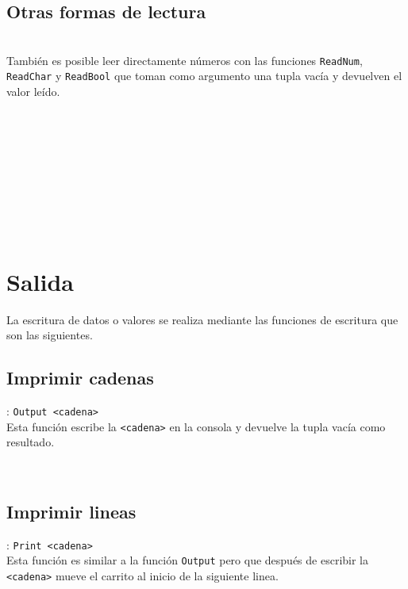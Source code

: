       \subsection*{Otras formas de lectura}\texttt{}\\
      También es posible leer directamente números con las funciones \texttt{ReadNum}, \texttt{ReadChar} y \texttt{ReadBool} que toman como argumento una tupla vacía y devuelven el valor leído.
      
      \begin{fxcode}
         \\
         \\
         \\
         \\
         \\
         \\
         \\
         \\
      \end{fxcode}
      
   \section{Salida}
      La escritura de datos o valores se realiza mediante las funciones de escritura que son las siguientes.
      
      \subsection*{Imprimir cadenas}: \texttt{Output <cadena>}\\
      Esta función escribe la \texttt{<cadena>} en la consola y devuelve la tupla vacía como resultado.
      
      \begin{fxcode}
         \\
      \end{fxcode}
      
      \subsection*{Imprimir lineas}: \texttt{Print <cadena>}\\
      Esta función es similar a la función \texttt{Output} pero que después de escribir la \texttt{<cadena>} mueve el carrito al inicio de la siguiente linea.
      
